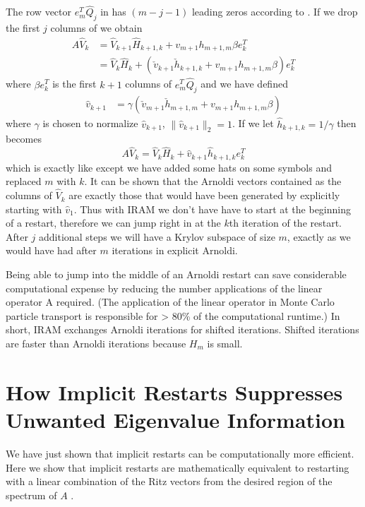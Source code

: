 The row vector \mbox{$e_m^T\hat{Q}_j$} in  has \mbox{$\left( m-j-1 \right)$} leading zeros according to .  If we drop the first $j$ columns of  we obtain
\begin{equation}
    \begin{split}
        A \hat{V}_k &= \hat{V}_{k+1}\hat{H}_{k+1,k} + v_{m+1}h_{m+1,m}\beta e_k^T \\
        &= \hat{V}_k\hat{H}_k + \left( \check{v}_{k+1}\check{h}_{k+1,k} + v_{m+1}h_{m+1,m}\beta \right) e_k^T
    \end{split}
    \label{eq:IRAMcheck}
\end{equation}
where $\beta e_k^T$ is the first $k+1$ columns of $e_m^T\hat{Q}_j$ and we have defined 
\begin{align}
    \hat{v}_{k+1} &= \gamma\left(\check{v}_{m+1}\check{h}_{m+1,m} + v_{m+1}h_{m+1,m}\beta \right)
\end{align}
where $\gamma$ is chosen to normalize $\hat{v}_{k+1}$, $\|\hat{v}_{k+1}\|_2 = 1$.  If we let $\hat{h}_{k+1,k} = 1/\gamma$ then  becomes
\begin{equation}
    A \hat{V}_k = \hat{V}_k\hat{H}_k + \hat{v}_{k+1}\hat{h}_{k+1,k} e_k^T
    \label{eq:IRAMhat}
\end{equation}
which is exactly like  except we have added some hats on some symbols and replaced $m$ with $k$.  It can be shown \citep[see][]{Watkins:2002Funda-0} that the Arnoldi vectors contained as the columns of $\hat{V}_k$ are exactly those that would have been generated by explicitly starting with $\hat{v}_1$.  Thus with IRAM we don't have have to start at the beginning of a restart, therefore we can jump right in at the $k$th iteration of the restart.  After $j$ additional steps we will have a Krylov subspace of size $m$, exactly as we would have had after $m$ iterations in explicit Arnoldi.

Being able to jump into the middle of an Arnoldi restart can save considerable computational expense by reducing the number applications of the linear operator A required.  (The application of the linear operator in Monte Carlo particle transport is responsible for > 80\% of the computational runtime.)  In short, IRAM exchanges Arnoldi iterations for shifted \QR iterations.  Shifted \QR iterations are faster than Arnoldi iterations because $H_m$ is small.

\section*{How Implicit Restarts Suppresses Unwanted Eigenvalue Information}
We have just shown that implicit restarts can be computationally more efficient.  Here we show that implicit restarts are mathematically equivalent to restarting with a linear combination of the Ritz vectors from the desired region of the spectrum of $A$ \citep[see][Chapter~5,~pg.~456]{Watkins:2002Funda-0}.

